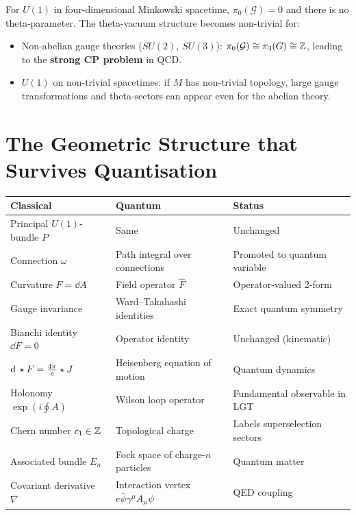 For $U(1)$ in four-dimensional Minkowski spacetime, $\pi_0(\mathcal{G}) = 0$ and there is no theta-parameter. The theta-vacuum structure becomes non-trivial for:
\begin{itemize}
\item Non-abelian gauge theories ($SU(2)$, $SU(3)$): $\pi_0(\mathcal{G}) \cong \pi_3(G) \cong \mathbb{Z}$, leading to the \textbf{strong CP problem} in QCD.
\item $U(1)$ on non-trivial spacetimes: if $M$ has non-trivial topology, large gauge transformations and theta-sectors can appear even for the abelian theory.
\end{itemize}

\section{The Geometric Structure that Survives Quantisation}

\begin{table}[h]
\centering
\renewcommand{\arraystretch}{1.5}
\begin{tabular}{lll}
\toprule
\textbf{Classical} & \textbf{Quantum} & \textbf{Status} \\
\midrule
Principal $U(1)$-bundle $P$ & Same & Unchanged \\
Connection $\omega$ & Path integral over connections & Promoted to quantum variable \\
Curvature $F = \dd A$ & Field operator $\hat{F}$ & Operator-valued 2-form \\
Gauge invariance & Ward--Takahashi identities & Exact quantum symmetry \\
Bianchi identity $\dd F = 0$ & Operator identity & Unchanged (kinematic) \\
$\mathrm{d}\,\star F = \frac{4\pi}{c}\star J$ & Heisenberg equation of motion & Quantum dynamics \\
Holonomy $\exp(i\oint A)$ & Wilson loop operator & Fundamental observable in LGT \\
Chern number $c_1 \in \mathbb{Z}$ & Topological charge & Labels superselection sectors \\
Associated bundle $E_n$ & Fock space of charge-$n$ particles & Quantum matter \\
Covariant derivative $\nabla$ & Interaction vertex $e\bar{\psi}\gamma^\mu A_\mu\psi$ & QED coupling \\
\bottomrule
\end{tabular}
\end{table}

